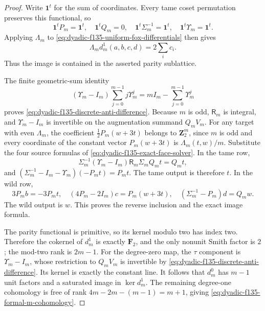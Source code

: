 \begin{proof}
Write $\mathbf1^t$
for the sum
of coordinates.
Every tame coset
permutation preserves
this functional,
so
\[
\mathbf1^tP_m
=\mathbf1^t,\quad
\mathbf1^tQ_m=0,\quad
\mathbf1^t\Sigma_m^{-1}
=\mathbf1^t,\quad
\mathbf1^t\Upsilon_m
=\mathbf1^t.
\]
Applying
$\Lambda_m$ to
\eqref{eq:dyadic-f135-uniform-fox-differentials}
then gives
\begin{equation}\label{eq:dyadic-f135-face-trace-boundary}
\boxed{\quad
\Lambda_m d_m^1(a,b,c,d)
=2\sum_i c_i.
\quad}
\end{equation}
Thus the
image is contained
in the asserted
parity sublattice.

The finite
geometric-sum
identity
\[
(\Upsilon_m-I_m)
\sum_{j=0}^{m-1}
j\Upsilon_m^j
=
mI_m-\sum_{j=0}^{m-1}
\Upsilon_m^j
\]
proves
\eqref{eq:dyadic-f135-discrete-anti-difference}.
Because $m$ is odd,
$\mathsf R_m$
is integral,
and
$\Upsilon_m-I_m$
is invertible
on the augmentation
summand $Q_mV_m$.
For any target
with even
$\Lambda_m$,
the coefficient
$\tfrac12P_m(w+3t)$
belongs to
$\mathbf Z_2^m$,
since $m$ is odd
and every
coordinate of
the constant
vector $P_m(w+3t)$
is $\Lambda_m(t,w)/m$.
Substitute the
four source
formulas of
\eqref{eq:dyadic-f135-exact-face-solver}.
In the tame row,
\[
\Sigma_m^{-1}
(\Upsilon_m-I_m)
\mathsf R_m\Sigma_mQ_mt
=Q_mt,
\]
and
$(\Sigma_m^{-1}-I_m-\Upsilon_m)
(-P_mt)=P_mt$.
The tame output
is therefore $t$.
In the wild row,
\[
3P_mb=-3P_mt,\quad
(4P_m-2I_m)c
=P_m(w+3t),\quad
(\Sigma_m^{-1}-P_m)d
=Q_mw.
\]
The wild output
is $w$.
This proves the
reverse inclusion
and the exact
image formula.

The parity
functional is
primitive, so
its kernel
modulo two
has index two.
Therefore the
cokernel of
$d_m^1$ is
exactly $\mathbf F_2$,
and the only
nonunit Smith
factor is $2$;
the mod-two
rank is $2m-1$.
For the
degree-zero map,
the $\tau$
component is
$\Upsilon_m-I_m$,
whose restriction
to $Q_mV_m$
is invertible
by
\eqref{eq:dyadic-f135-discrete-anti-difference}.
Its kernel
is exactly the
constant line.
It follows that
$d_m^0$ has
$m-1$ unit
factors and a
saturated image
in $\ker d_m^1$.
The remaining
degree-one
cohomology is
free of rank
$4m-2m-(m-1)=m+1$,
giving
\eqref{eq:dyadic-f135-formal-m-cohomology}.
\end{proof}

